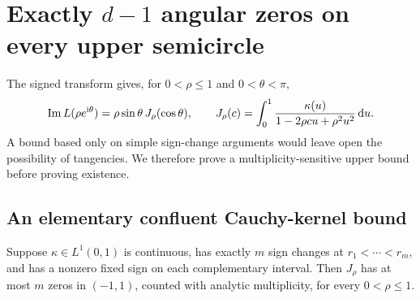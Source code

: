 \section{Exactly \texorpdfstring{$d-1$}{d-1} angular zeros on every upper semicircle}
\label{ado:sec:angular}
The signed transform gives, for $0<\rho\le1$ and $0<\theta<\pi$,
\begin{equation}\label{ado:eq:angulartransform}
 \operatorname{Im} L(\rho e^{\mathrm i\theta})
 =\rho\sin\theta\,J_\rho(\cos\theta),\qquad
 J_\rho(c)=\int_0^1
       \frac{\kappa(u)}{1-2\rho cu+\rho^2u^2}\,\mathrm d u.
\end{equation}
A bound based only on simple sign-change arguments would leave open the
possibility of tangencies. We therefore prove a multiplicity-sensitive
upper bound before proving existence.

\subsection{An elementary confluent Cauchy-kernel bound}
\begin{lemma}
\label{ado:lem:variation}
Suppose $\kappa\in L^1(0,1)$ is continuous, has exactly $m$ sign
changes at $r_1<\cdots<r_m$, and has a nonzero fixed sign on each
complementary interval. Then $J_\rho$ has at most $m$ zeros in
$(-1,1)$, counted with analytic multiplicity, for every $0<\rho\le1$.
\end{lemma}
